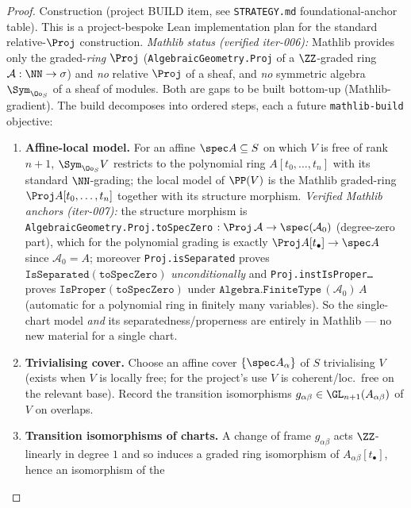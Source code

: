 \begin{proof}
  Construction (project BUILD item, see \texttt{STRATEGY.md} foundational-anchor
  table). This is a project-bespoke Lean implementation plan for the standard
  relative-$\Proj$ construction. \emph{Mathlib status (verified iter-006):}
  Mathlib provides only the graded-\emph{ring} $\Proj$
  (\texttt{AlgebraicGeometry.Proj} of a $\ZZ$-graded ring $\mathcal A:\NN\to\sigma$)
  and \emph{no} relative $\Proj$ of a sheaf, and \emph{no} symmetric algebra
  $\Sym_{\Oo_S}$ of a sheaf of modules. Both are gaps to be built bottom-up
  (Mathlib-gradient). The build decomposes into ordered steps, each a future
  \texttt{mathlib-build} objective:

  \begin{enumerate}
    \item \textbf{Affine-local model.} For an affine $\spec A\subseteq S$ on which
      $V$ is free of rank $n+1$, $\Sym_{\Oo_S}V$ restricts to the polynomial ring
      $A[t_0,\dots,t_n]$ with its standard $\NN$-grading; the local model of
      $\PP(V)$ is the Mathlib graded-ring $\Proj A[t_0,\dots,t_n]$ together with
      its structure morphism. \emph{Verified Mathlib anchors (iter-007):} the
      structure morphism is \texttt{AlgebraicGeometry.Proj.toSpecZero}
      $: \Proj\,\mathcal A\to\spec(\mathcal A_0)$ (degree-zero part), which for the
      polynomial grading is exactly $\Proj A[t_\bullet]\to\spec A$ since
      $\mathcal A_0 = A$; moreover \texttt{Proj.isSeparated} proves
      $\texttt{IsSeparated}(\texttt{toSpecZero})$ \emph{unconditionally} and
      \texttt{Proj.instIsProper\ldots} proves $\texttt{IsProper}(\texttt{toSpecZero})$
      under $\texttt{Algebra.FiniteType}\,(\mathcal A_0)\,A$ (automatic for a
      polynomial ring in finitely many variables). So the single-chart model
      \emph{and} its separatedness/properness are entirely in Mathlib — no new
      material for a single chart.
    \item \textbf{Trivialising cover.} Choose an affine cover $\{\spec A_\alpha\}$
      of $S$ trivialising $V$ (exists when $V$ is locally free; for the project's
      use $V$ is coherent/loc.\ free on the relevant base). Record the transition
      isomorphisms $g_{\alpha\beta}\in\GL_{n+1}(A_{\alpha\beta})$ of $V$ on
      overlaps.
    \item \textbf{Transition isomorphisms of charts.} A change of frame
      $g_{\alpha\beta}$ acts $\ZZ$-linearly in degree $1$ and so induces a graded
      ring isomorphism of $A_{\alpha\beta}[t_\bullet]$, hence an isomorphism of the

\end{enumerate}
\end{proof}
